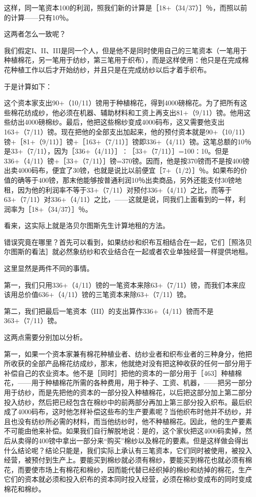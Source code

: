这样，同一笔资本100的利润，照我们新的计算是［18+（34/37）］％，而照以前的计算——只有10％。

这两者怎么一致呢？

我们假定I、II、III是同一个人，但是他不是同时使用自己的三笔资本（一笔用于种植棉花，另一笔用于纺纱，第三笔用于织布），而是这样使用：他只是在完成棉花种植工作以后才开始纺纱，并且只是在完成纺纱以后才着手织布。

于是计算如下：

这个资本家支出90+（10/11）镑用于种植棉花，得到4000磅棉花。为了把所有这些棉花纺成纱，他必须在机器、辅助材料和工资上再支出81+（9/11）镑。他用这些纺出4000磅棉纱。最后，他把这些棉纱变成4000码布，这又需要他支出163+（7/11）镑。现在把他的全部支出加起来，他的预付资本就是90+（10/11）镑+［81+（9/11）］镑+［163+（7/11）］镑即336+（4/11）镑。这笔总额的10％是33+（7/11），因为［336+（4/11）］∶［33+（7/11）］=100∶10。但是336+（4/11）镑+［33+（7/11）］镑=370镑。因而，他是按370镑而不是按400镑出卖4000码布，便宜了30镑，也就是说比以前便宜［7+（1/2）］％。如果布的价值的确等于400镑，那末他能够按普通利润10％出卖商品，另外还能支付30镑地租，因为他的利润率不等于33+（7/11）对预付336+（4/11）之比，而等于63+（7/11）对336+（4/11）之比，——这就是说，同我们上面看到的一样，利润率为［18+（34/37）］％。

看来，这实际上就是洛贝尔图斯先生计算地租的方法。

错误究竟在哪里？首先可以看到，如果纺纱和织布互相结合在一起，它们［照洛贝尔图斯的看法］就必然象纺纱和农业结合在一起或者农业单独经营一样提供地租。

这里显然是两件不同的事情。

第一，我们只用336+（4/11）镑的一笔资本来除63+（7/11）镑，而我们本来应该用总价值636+（4/11）镑的三笔资本来除63+（7/11）镑。

第二，我们把最后一笔资本（III）的支出算作336+（4/11）镑而不是363+（7/11）镑。

这两点需要分别加以分析。

第一，如果一个资本家兼有棉花种植业者、纺纱业者和织布业者的三种身分，他把所收获的全部产品棉花纺成纱，那末，他就绝对没有把这种收获的任何一部分用于补偿自己的农业资本。他不是［同时］把他的资本的一部分用于［463］种植棉花，——用于种植棉花所需的各种费用，用于种子、工资、机器，——把另一部分用于纺纱，而是先把他的资本的一部分投入种植棉花，以后把这部分加上第二部分投入纺纱，然后把已经包含在棉纱中的前两部分再加上第三部分投入织布。最后织成了4000码布，这时他怎样补偿这些布的生产要素呢？当他织布时他并不纺纱，并且也没有纺纱所必需的材料，而当他纺纱时，他不种植棉花。因此，他的生产要素不可能由他来补偿。如果我们自行解脱地说：是的，这个家伙把这4000码卖掉，然后从卖得的400镑中拿出一部分来“购买”棉纱以及棉花的要素。但是这样做会得出什么结论呢？结论只能是，我们实际上承认有三笔资本，它们同时被使用，被投入经营，被预付到生产上。要能买到棉纱就必须有棉纱，要能买到棉花也就必须有棉花，而要使市场上有棉花和棉纱，因而能代替已经织掉的棉纱和纺掉的棉花，生产它们的资本就必须和投入织布的资本同时投入经营，必须在棉纱变成布的同时变成棉花和棉纱。

